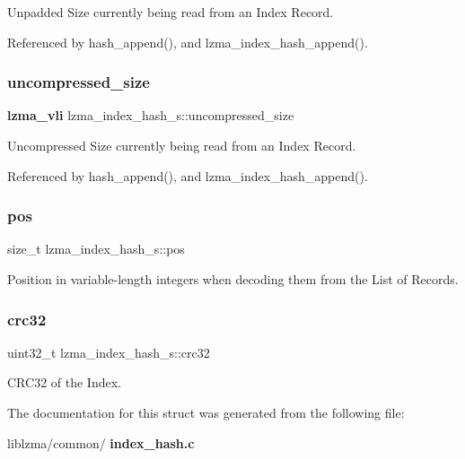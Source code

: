 Unpadded Size currently being read from an Index Record. 



Referenced by hash\+\_\+append(), and lzma\+\_\+index\+\_\+hash\+\_\+append().

\mbox{\label{structlzma__index__hash__s_a6001472cdcba7a6fee214b295fd81a2d}} 
\subsubsection{uncompressed\+\_\+size}
{\footnotesize\ttfamily \textbf{ lzma\+\_\+vli} lzma\+\_\+index\+\_\+hash\+\_\+s\+::uncompressed\+\_\+size}



Uncompressed Size currently being read from an Index Record. 



Referenced by hash\+\_\+append(), and lzma\+\_\+index\+\_\+hash\+\_\+append().

\mbox{\label{structlzma__index__hash__s_ac63219f34e9a2524d23b0593b174790d}} 
\subsubsection{pos}
{\footnotesize\ttfamily size\+\_\+t lzma\+\_\+index\+\_\+hash\+\_\+s\+::pos}

Position in variable-\/length integers when decoding them from the List of Records. \mbox{\label{structlzma__index__hash__s_a6f60785c4fd00c44fc1f272c733c2f97}} 
\subsubsection{crc32}
{\footnotesize\ttfamily uint32\+\_\+t lzma\+\_\+index\+\_\+hash\+\_\+s\+::crc32}



C\+R\+C32 of the Index. 



The documentation for this struct was generated from the following file\+:\begin{DoxyCompactItemize}
\item 
liblzma/common/\textbf{ index\+\_\+hash.\+c}\end{DoxyCompactItemize}
